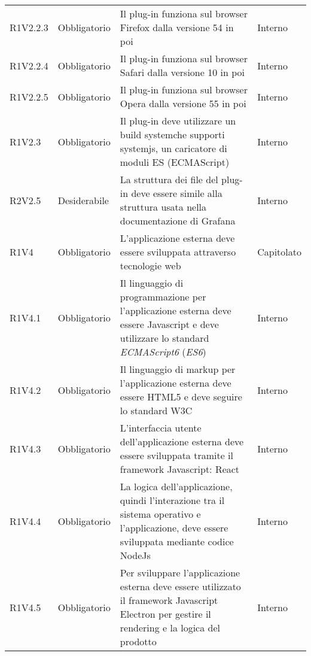 \begin{longtable} {
		>{\centering}p{18mm} 
		>{\centering}p{28mm}
		>{}p{50mm} 
		>{}p{28mm}
		}
	R1V2.2.3 & 
	Obbligatorio & 
	Il plug-in funziona sul browser Firefox dalla versione 54 in poi &
	Interno  \TBstrut \\ [2mm]
	
	R1V2.2.4 & 
	Obbligatorio & 
	Il plug-in funziona sul browser Safari dalla versione 10 in poi &
	Interno  \TBstrut \\ [2mm]
	
	R1V2.2.5 & 
	Obbligatorio & 
	Il plug-in funziona sul browser Opera dalla versione 55 in poi &
	Interno  \TBstrut \\ [2mm]
	
	R1V2.3 & 
	Obbligatorio & 
	Il plug-in deve utilizzare un build system\glosp che supporti systemjs, un caricatore di moduli ES (ECMAScript) &
	Interno  \TBstrut \\ [2mm]
	
	R2V2.5 &
	Desiderabile &
	La struttura dei file del plug-in deve essere simile alla struttura usata nella documentazione di Grafana\glo &
	Interno  \TBstrut \\ [2mm]
	
	R1V4 & 
	Obbligatorio & 
	L'applicazione esterna deve essere sviluppata attraverso tecnologie web &
	Capitolato \TBstrut \\ [2mm]
	
	R1V4.1 & 
	Obbligatorio & 
	Il linguaggio di programmazione per l'applicazione esterna deve essere Javascript e deve utilizzare lo standard \textit{ECMAScript6} (\textit{ES6}) &
	Interno  \TBstrut \\ [2mm]
	
	R1V4.2 & 
	Obbligatorio & 
	Il linguaggio di markup per l'applicazione esterna deve essere HTML5 e deve seguire lo standard W3C &
	Interno  \TBstrut \\ [2mm]

	R1V4.3 & 
	Obbligatorio & 
	L'interfaccia utente dell'applicazione esterna deve essere sviluppata tramite il framework Javascript: React &
	Interno  \TBstrut \\ [2mm]

	R1V4.4 & 
	Obbligatorio & 
	La logica dell'applicazione, quindi l'interazione tra il sistema operativo e l'applicazione, deve essere sviluppata mediante codice NodeJs &
	Interno  \TBstrut \\ [2mm]

	R1V4.5 & 
	Obbligatorio & 
	Per sviluppare l'applicazione esterna deve essere utilizzato il framework Javascript Electron per gestire il rendering e la logica del prodotto &
	Interno  \TBstrut \\ [2mm]


\end{longtable}

